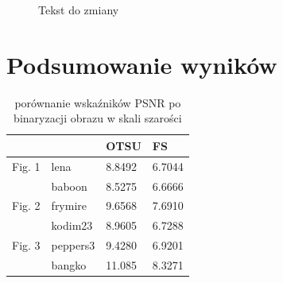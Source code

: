 \begin{figure}[H]
    \caption{Tekst do zmiany} 
    \label{fig:porownanie8}
\end{figure}


\section*{Podsumowanie wyników}


\begin{table}[H]
    \caption{porównanie wskaźników PSNR po binaryzacji obrazu w skali szarości}
    \centering
    \begin{tabular}{llll}
    \hline
             &           & OTSU   & FS       \\ \hline
    Fig. 1 & lena      & 8.8492 & 6.7044   \\ 
             & baboon    & 8.5275 & 6.6666   \\ 
    Fig. 2 & frymire   & 9.6568 & 7.6910   \\ 
             & kodim23   & 8.9605 & 6.7288   \\ 
    Fig. 3 & peppers3  & 9.4280 & 6.9201   \\ 
             & bangko    & 11.085 & 8.3271   \\ \hline
    \end{tabular}
\end{table}


